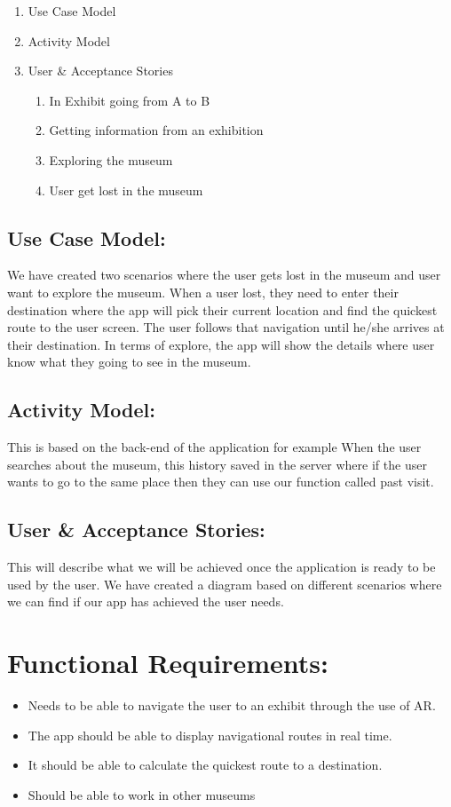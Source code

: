 \begin{enumerate}
    \item Use Case Model
    \item Activity Model
    \item User & Acceptance Stories
    \begin{enumerate}
        \item In Exhibit going from A to B
        \item Getting information from an exhibition
        \item Exploring the museum
        \item User get lost in the museum
    \end{enumerate}
\end{enumerate}

\subsection{Use Case Model:}
We have created two scenarios where the user gets lost in the museum and user want to explore the museum. When a user lost, they need to enter their destination where the app will pick their current location and find the quickest route to the user screen. The user follows that navigation until he/she arrives at their destination. In terms of explore, the app will show the details where user know what they going to see in the museum.

\subsection{Activity Model:}
This is based on the back-end of the application for example When the user searches about the museum, this history saved in the server where if the user wants to go to the same place then they can use our function called past visit.

\subsection{User & Acceptance Stories:}
This will describe what we will be achieved once the application is ready to be used by the user. We have created a diagram based on different scenarios where we can find if our app has achieved the user needs. 

\section{Functional Requirements:}
    \begin{itemize}
        \item Needs to be able to navigate the user to an exhibit through the use of AR.
        \item The app should be able to display navigational routes in real time.
        \item It should be able to calculate the quickest route to a destination.
        \item Should be able to work in other museums
    \end{itemize}
